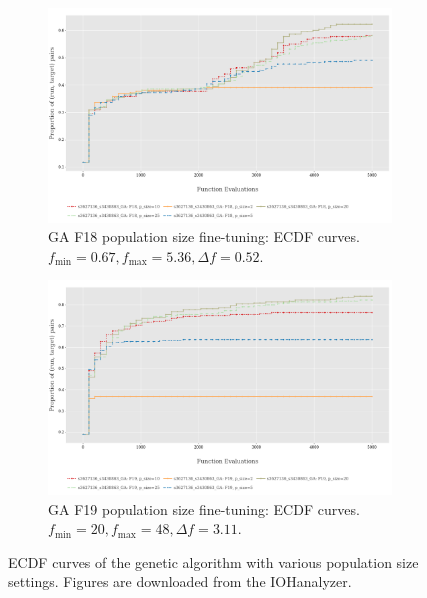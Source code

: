 \documentclass{article}
\begin{document}
\begin{figure}[!ht]
    \centering
    \begin{subfigure}[h]{0.95\linewidth}
        \includegraphics[width=\linewidth]{ga/f18/psize_ecdf.png}
        \caption{GA F18 population size fine-tuning: ECDF curves. $f_{\min} = 0.67, f_{\max} = 5.36, \Delta f = 0.52$.}
    \end{subfigure}
    \hfill
    \begin{subfigure}[h]{0.95\linewidth}
        \includegraphics[width=\linewidth]{ga/f19/psize_ecdf.png}
        \caption{GA F19 population size fine-tuning: ECDF curves. $f_{\min} = 20, f_{\max} = 48, \Delta f = 3.11$.}
    \end{subfigure}
    \caption{ECDF curves of the genetic algorithm with various population size settings. Figures are downloaded from the IOHanalyzer.}
    \label{fig:experi-ga-psize-ecdf}
\end{figure}
\end{document}

